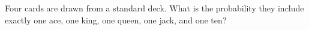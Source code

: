 Four cards are drawn from a standard deck. What is the probability they include exactly one ace, one king, one queen, one jack, and one ten?
